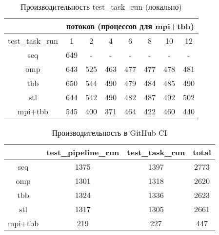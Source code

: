 \documentclass[12pt,a4paper]{extarticle}
\begin{document}
\begin{table}[H]
\centering
\begin{tabular}{|c|c|c|c|c|c|c|c|} \hline
 & \multicolumn{7}{|c|}{потоков (процессов для mpi+tbb)}\\
\hline 
test\_task\_run & 1 & 2 & 4 & 6 & 8 & 10 & 12 \\
\hline 
seq & 649 &  -&-&-&-&-&-\\
\hline 
omp & 643 & 525 & 463 & 477 & 477 & 478 & 481 \\
\hline 
tbb & 650 & 544 & 490 & 479 & 484 & 485 & 490 \\
\hline 
stl & 644 & 542 & 490 & 482 & 487 & 492 & 502 \\
\hline 
mpi+tbb & 545 & 400 & 371 & 464 & 422 & 460 & 440 \\
\hline 
\end{tabular}
\caption{Производительность test\_task\_run (локально)}
\label{sec:testtaskrunPerf}
\end{table}

\begin{table}[H]
\centering
\begin{tabular}{|c|c|c|c|}    
\hline
 & test\_pipeline\_run & test\_task\_run & total \\
 \hline
seq & 1375 & 1397 & 2773 \\
\hline
omp & 1301 & 1318 & 2620 \\
\hline
tbb & 1324 & 1336 & 2623 \\
\hline
stl & 1317 & 1305 & 2661 \\
\hline
mpi+tbb & 219 & 227 & 447 \\
\hline
\end{tabular}
\caption{Производительность в GitHub CI}
\label{sec:ciPerf}
\end{table}
\end{document}
